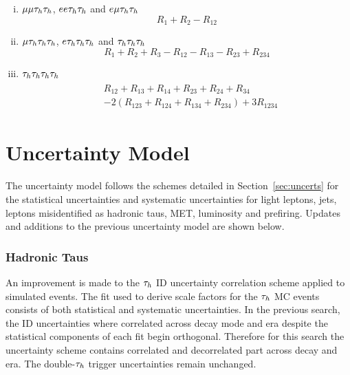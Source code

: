 \begin{enumerate}[i)]
\item $\mu\mu\tau_{h}\tau_{h}$, $ee\tau_{h}\tau_{h}$ and $e\mu\tau_{h}\tau_{h}$
\begin{equation}
R_1 + R_2 - R_{12}
\end{equation}

\item $\mu\tau_{h}\tau_{h}\tau_{h}$, $e\tau_{h}\tau_{h}\tau_{h}$ and $\tau_{h}\tau_{h}\tau_{h}$
\begin{equation}
R_1 + R_2 + R_3 - R_{12} - R_{13} - R_{23} + R_{234}
\end{equation}

\item $\tau_{h}\tau_{h}\tau_{h}\tau_{h}$
\begin{align}
\begin{split}
&R_{12} + R_{13} + R_{14} + R_{23} + R_{24} + R_{34} \\
&- 2(R_{123} + R_{124} + R_{134} + R_{234}) + 3R_{1234}
\end{split}
\end{align}
\end{enumerate}
 
\section{Uncertainty Model}

The uncertainty model follows the schemes detailed in Section~\ref{sec:uncerts} for the statistical uncertainties and systematic uncertainties for light leptons, jets, leptons misidentified as hadronic taus, MET, luminosity and prefiring.
Updates and additions to the previous uncertainty model are shown below. \\

\subsubsection{Hadronic Taus}
An improvement is made to the $\tau_{h}$ ID uncertainty correlation scheme applied to simulated events.
The fit used to derive scale factors for the $\tau_{h}$ MC events consists of both statistical and systematic uncertainties.
In the previous search, the ID uncertainties where correlated across decay mode and era despite the statistical components of each fit begin orthogonal.
Therefore for this search the uncertainty scheme contains correlated and decorrelated part across decay and era.
The double-$\tau_{h}$ trigger uncertainties remain unchanged. \\

